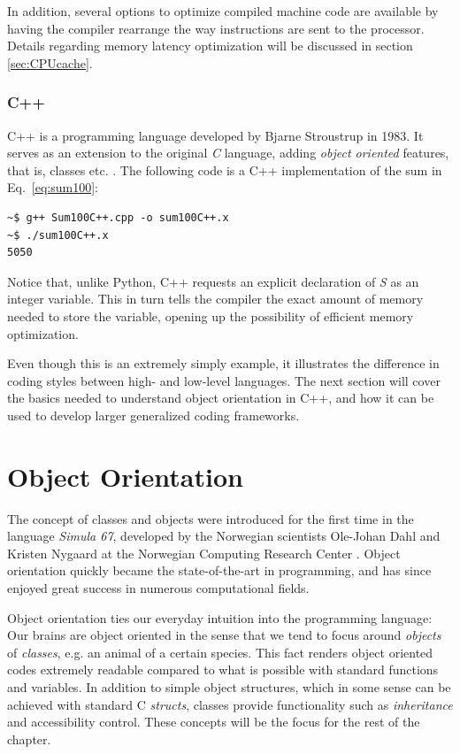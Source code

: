 In addition, several options to optimize compiled machine code are available by having the compiler rearrange the way instructions are sent to the processor. Details regarding memory latency optimization will be discussed in section \ref{sec:CPUcache}. 

\subsubsection{C++}

C++ is a programming language developed by Bjarne Stroustrup in 1983. It serves as an extension to the original \textit{C} language, adding \textit{object oriented} features, that is, classes etc. \cite{ORegan}. The following code is a C++ implementation of the sum in Eq.~\ref{eq:sum100}:

\vspace{0.5 cm}


\begin{verbatim}
~$ g++ Sum100C++.cpp -o sum100C++.x
~$ ./sum100C++.x 
5050
\end{verbatim}


Notice that, unlike Python, C++ requests an explicit declaration of \textit{S} as an integer variable. This in turn tells the compiler the exact amount of memory needed to store the variable, opening up the possibility of efficient memory optimization. 

Even though this is an extremely simply example, it illustrates the difference in coding styles between high- and low-level languages. The next section will cover the basics needed to understand object orientation in C++, and how it can be used to develop larger generalized coding frameworks.

\section{Object Orientation}
\label{sec:OO}

The concept of classes and objects were introduced for the first time in the language \textit{Simula 67}, developed by the Norwegian scientists Ole-Johan Dahl and Kristen Nygaard at the Norwegian Computing Research Center \cite{ORegan}. Object orientation quickly became the state-of-the-art in programming, and has since enjoyed great success in numerous computational fields. 

Object orientation ties our everyday intuition into the programming language: Our brains are object oriented in the sense that we tend to focus around \textit{objects} of \textit{classes}, e.g. an animal of a certain species. This fact renders object oriented codes extremely readable compared to what is possible with standard functions and variables. In addition to simple object structures, which in some sense can be achieved with standard C \textit{structs}, classes provide functionality such as \textit{inheritance} and accessibility control. These concepts will be the focus for the rest of the chapter. 

